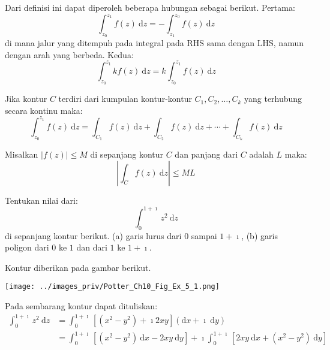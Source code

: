 Dari definisi ini dapat diperoleh beberapa hubungan sebagai berikut.
Pertama:
\begin{equation}
\int_{z_{0}}^{z_{1}}f(z)\ \mathrm{d}z=-\int_{z_{1}}^{z_{0}}f(z)\ \mathrm{d}z
\end{equation}
di mana jalur yang ditempuh pada integral pada RHS sama dengan LHS,
namun dengan arah yang berbeda.
Kedua:
\begin{equation}
\int_{z_{0}}^{z_{1}}kf(z)\ \mathrm{d}z = k \int_{z_{0}}^{z_{1}}f(z)\ \mathrm{d}z
\end{equation}

Jika kontur $C$ terdiri dari kumpulan kontur-kontur $C_{1},C_{2},\ldots,C_{k}$
yang terhubung secara kontinu maka:
\begin{equation*}
\int_{z_{0}}^{z_{1}}f(z)\ \mathrm{d}z =
\int_{C_{1}}f(z)\ \mathrm{d}z + \int_{C_{2}}f(z)\ \mathrm{d}z + \cdots +
\int_{C_{k}}f(z)\ \mathrm{d}z
\end{equation*}

\begin{theorem}
Misalkan $\left| f(z) \right| \leq M$ di sepanjang kontur $C$ dan panjang
dari $C$ adalah $L$ maka:
\begin{equation*}
\left|\int_{C}f(z)\ \mathrm{d}z\right|\leq ML
\end{equation*}
\end{theorem}



\begin{contoh}
Tentukan nilai dari:
\begin{equation*}
\int_{0}^{1 + \imath} z^{2}\ \mathrm{d}z    
\end{equation*}
di sepanjang kontur berikut. (a) garis lurus dari $0$ sampai $1+\imath$,
(b) garis poligon dari $0$ ke $1$ dan dari $1$ ke $1+\imath$.
\end{contoh}

Kontur diberikan pada gambar berikut.

{\centering
\texttt{[image: ../images\_priv/Potter\_Ch10\_Fig\_Ex\_5\_1.png]}
\par}

Pada sembarang kontur dapat dituliskan:
\begin{align*}
\int_{0}^{1+\imath}z^{2}\ \mathrm{d}z & = \int_{0}^{1 + \imath}
\left[ \left( x^{2}-y^{2} \right) + \imath 2xy \right]
\left( \mathrm{d}x +\imath\ \mathrm{d}y \right) \\
 & =\int_{0}^{1 + \imath} \left[ \left( x^{2}-y^{2} \right)\ \mathrm{d}x -
 2xy\ \mathrm{d}y \right] + \imath \int_{0}^{1 + \imath}
 \left[ 2xy\ \mathrm{d}x + \left(x^{2}-y^{2} \right)\ \mathrm{d}y\right]
\end{align*}

